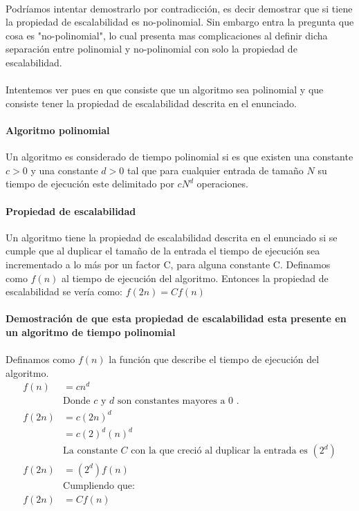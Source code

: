 \documentclass[12pt]{article}
\begin{document}
\paragraph{}
Podríamos intentar demostrarlo por contradicción, es decir demostrar que si tiene la propiedad de escalabilidad es no-polinomial.
Sin embargo entra la pregunta que cosa es "no-polinomial", lo cual presenta mas complicaciones al definir dicha separación entre polinomial y no-polinomial con solo la propiedad de escalabilidad.
\paragraph{}
Intentemos ver pues en que consiste que un algoritmo sea polinomial y que consiste tener la propiedad de escalabilidad descrita en el enunciado.
\paragraph{Algoritmo polinomial}
Un algoritmo es considerado de tiempo polinomial si es que existen una constante $c>0$ y una constante $d>0$ tal que para cualquier entrada de tamaño $N$ su tiempo de ejecución este delimitado por $cN^{d}$ operaciones.
\paragraph{Propiedad de escalabilidad}
Un algoritmo tiene la propiedad de escalabilidad descrita en el enunciado si se cumple que al duplicar el tamaño de la entrada el tiempo de ejecución sea incrementado a lo más por un factor C, para alguna constante C.
Definamos como $f(n)$ al tiempo de ejecución del algoritmo.  Entonces la propiedad de escalabilidad se vería como:
$f(2n) = Cf(n)$\\
 \pagebreak
 \paragraph{Demostración de que esta propiedad de escalabilidad esta presente en un algoritmo de tiempo polinomial}
 \paragraph{}
 Definamos como $f(n)$ la función que describe el tiempo de ejecución del algoritmo.
\begin{equation}\label{poli_time}
\begin{split}
f(n) &= cn^{d}\\
&\text{Donde $c$ y $d$ son constantes mayores a 0 .}\\
f(2n) &= c(2n)^{d} \\
&=c(2)^{d}(n)^{d}\\
&\text{La constante $C$ con la que creció al duplicar la entrada es $(2^{d})$}\\
f(2n) &= (2^{d})f(n) \\
&\text{Cumpliendo que:}\\
f(2n) &= Cf(n)
\end{split}
\end{equation}
\end{document}
